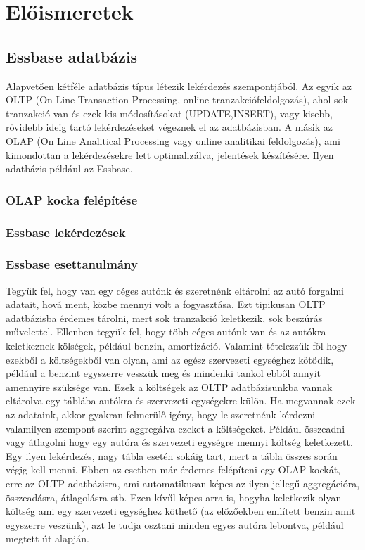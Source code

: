 \chapter{Előismeretek}\label{sect:Preliminaries}
\section{Essbase adatbázis}
Alapvetően kétféle adatbázis típus létezik lekérdezés szempontjából. Az egyik az OLTP (On Line Transaction Processing, online tranzakciófeldolgozás), ahol sok tranzakció van és ezek kis módosításokat (UPDATE,INSERT), vagy kisebb, rövidebb ideig tartó lekérdezéseket végeznek el az adatbázisban. A másik az OLAP (On Line Analitical Processing vagy online analitikai feldolgozás), ami kimondottan a lekérdezésekre lett optimalizálva, jelentések készítésére. Ilyen adatbázis például az Essbase.


\subsection{OLAP kocka felépítése}

\subsection{Essbase lekérdezések}

\subsection{Essbase esettanulmány}
Tegyük fel, hogy van egy céges autónk és szeretnénk eltárolni az autó forgalmi adatait, hová ment, közbe mennyi volt a fogyasztása. Ezt tipikusan OLTP adatbázisba érdemes tárolni, mert sok tranzakció keletkezik, sok beszúrás művelettel. Ellenben tegyük fel, hogy több céges autónk van és az autókra keletkeznek kölségek, például benzin, amortizáció. Valamint tételezzük föl hogy ezekből a költségekből van olyan, ami az egész szervezeti egységhez kötődik, például a benzint egyszerre vesszük meg és mindenki tankol ebből annyit amennyire szüksége van. Ezek a költségek az OLTP adatbázisunkba vannak eltárolva egy táblába autókra és szervezeti egységekre külön. Ha megvannak ezek az adataink, akkor gyakran felmerülő igény, hogy le szeretnénk kérdezni valamilyen szempont szerint aggregálva ezeket a költségeket. Például összeadni vagy átlagolni hogy egy autóra és szervezeti egységre mennyi költség keletkezett. Egy ilyen lekérdezés, nagy tábla esetén sokáig tart, mert a tábla összes során végig kell menni.  Ebben az esetben már érdemes felépíteni egy OLAP kockát, erre az OLTP adatbázisra, ami automatikusan képes az ilyen jellegű aggregációra, összeadásra, átlagolásra stb. Ezen kívűl képes arra is, hogyha keletkezik olyan költség ami egy szervezeti egységhez köthető (az előzőekben említett benzin amit egyszerre veszünk), azt le tudja osztani minden egyes autóra lebontva, például megtett út alapján.

